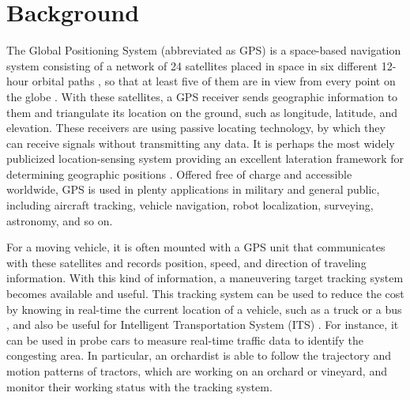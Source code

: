 
%
%
%



\section{Background}


The Global Positioning System (abbreviated as GPS) is a space-based navigation system consisting of a network of 24 satellites placed in space in six different 12-hour orbital paths \cite{agrawal2015introduction}, so that at least five of them are in view from every point on the globe \cite{kaplan2005understanding} \cite{bajaj2002gps}. With these satellites, a GPS receiver sends geographic information to them and triangulate its location on the ground, such as longitude, latitude, and elevation. These receivers are using passive locating technology, by which they can receive signals without transmitting any data. It is perhaps the most widely publicized location-sensing system providing an excellent lateration framework for determining geographic positions \cite{hightower2001location}. Offered free of charge and accessible worldwide, GPS is used in plenty applications in military and general public, including aircraft tracking, vehicle navigation, robot localization, surveying, astronomy, and so on. 

For a moving vehicle, it is often mounted with a GPS unit that communicates with these satellites and records position, speed, and direction of traveling information. With this kind of information, a maneuvering target tracking system becomes available and useful. This tracking system can be used to reduce the cost by knowing in real-time the current location of a vehicle, such as a truck or a bus \cite{chadil2008real}, and also be useful for Intelligent Transportation System (ITS) \cite{mcdonald2006intelligent}. For instance, it can be used in probe cars to measure real-time traffic data to identify the congesting area. In particular, an orchardist is able to follow the trajectory and motion patterns of tractors, which are working on an orchard or vineyard, and monitor their working status with the tracking system. 



